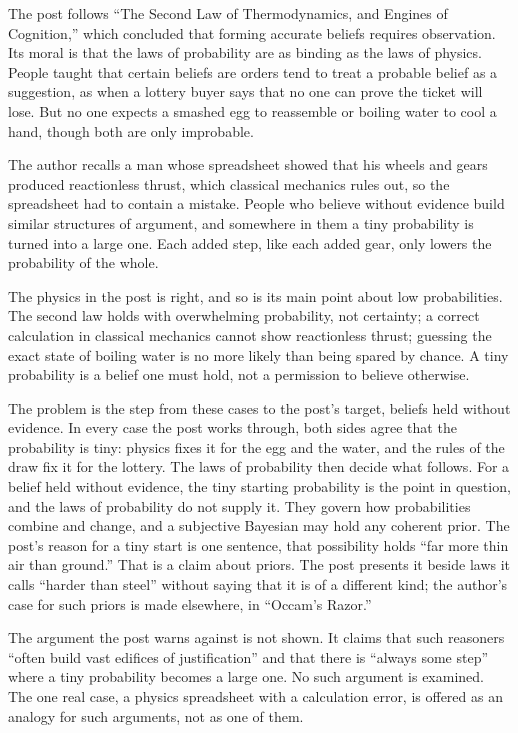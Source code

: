 \begin{afterword}
\summaryhead

The post follows ``The Second Law of Thermodynamics, and Engines of Cognition,'' which concluded that forming accurate beliefs requires observation. Its moral is that the laws of probability are as binding as the laws of physics. People taught that certain beliefs are orders tend to treat a probable belief as a suggestion, as when a lottery buyer says that no one can prove the ticket will lose. But no one expects a smashed egg to reassemble or boiling water to cool a hand, though both are only improbable.

The author recalls a man whose spreadsheet showed that his wheels and gears produced reactionless thrust, which classical mechanics rules out, so the spreadsheet had to contain a mistake. People who believe without evidence build similar structures of argument, and somewhere in them a tiny probability is turned into a large one. Each added step, like each added gear, only lowers the probability of the whole.

\responsehead

The physics in the post is right, and so is its main point about low probabilities. The second law holds with overwhelming probability, not certainty; a correct calculation in classical mechanics cannot show reactionless thrust; guessing the exact state of boiling water is no more likely than being spared by chance. A tiny probability is a belief one must hold, not a permission to believe otherwise.

The problem is the step from these cases to the post's target, beliefs held without evidence. In every case the post works through, both sides agree that the probability is tiny: physics fixes it for the egg and the water, and the rules of the draw fix it for the lottery. The laws of probability then decide what follows. For a belief held without evidence, the tiny starting probability is the point in question, and the laws of probability do not supply it. They govern how probabilities combine and change, and a subjective Bayesian may hold any coherent prior. The post's reason for a tiny start is one sentence, that possibility holds ``far more thin air than ground.'' That is a claim about priors. The post presents it beside laws it calls ``harder than steel'' without saying that it is of a different kind; the author's case for such priors is made elsewhere, in ``Occam's Razor.''

The argument the post warns against is not shown. It claims that such reasoners ``often build vast edifices of justification'' and that there is ``always some step'' where a tiny probability becomes a large one. No such argument is examined. The one real case, a physics spreadsheet with a calculation error, is offered as an analogy for such arguments, not as one of them.


\end{afterword}
